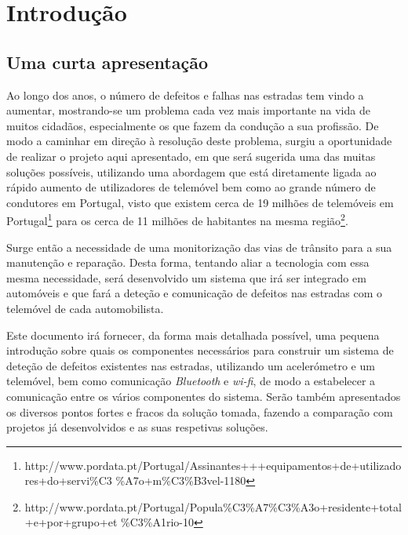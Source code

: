 \newcommand{\unlthesis}{\emph{unlthesis}}
\newcommand{\unlthesisclass}{\texttt{unlthesis.cls}}


\chapter{Introdução}
\label{cha:introdução}

\section{Uma curta apresentação} %
\label{sec:uma_curta_apresentação}

Ao longo dos anos, o número de defeitos e falhas nas estradas tem vindo a aumentar, mostrando-se um problema cada vez mais importante na vida de muitos cidadãos, especialmente os que fazem da condução a sua profissão. De modo a caminhar em direção à resolução deste problema, surgiu a oportunidade de realizar o projeto aqui apresentado, em que será sugerida uma das muitas soluções possíveis, utilizando uma abordagem que está diretamente ligada ao rápido aumento de utilizadores de telemóvel bem como ao grande número de condutores em Portugal, visto que existem cerca de 19 milhões de telemóveis em Portugal\footnote{http://www.pordata.pt/Portugal/Assinantes+++equipamentos+de+utilizadores+do+servi\%C3
\%A7o+m\%C3\%B3vel-1180} para os cerca de 11 milhões de habitantes na mesma região\footnote{http://www.pordata.pt/Portugal/Popula\%C3\%A7\%C3\%A3o+residente+total+e+por+grupo+et
\%C3\%A1rio-10}.

Surge então a necessidade de uma monitorização das vias de trânsito para a sua manutenção e reparação. Desta forma, tentando aliar a tecnologia com essa mesma necessidade, será desenvolvido um sistema que irá ser integrado em automóveis e que fará a deteção e comunicação de defeitos nas estradas com o telemóvel de cada automobilista.

Este documento irá fornecer, da forma mais detalhada possível, uma pequena introdução sobre quais os componentes necessários para construir um sistema de deteção de defeitos existentes nas estradas, utilizando um acelerómetro e um telemóvel, bem como comunicação \emph{Bluetooth} e \emph{wi-fi}, de modo a estabelecer a comunicação entre os vários componentes do sistema. Serão também apresentados os diversos pontos fortes e fracos da solução tomada, fazendo a comparação com projetos já desenvolvidos e as suas respetivas soluções.

